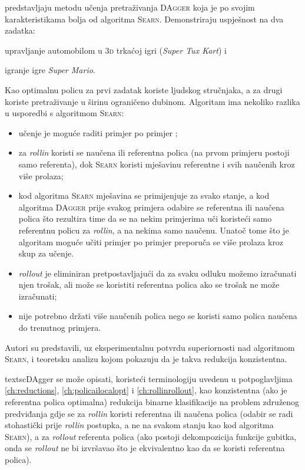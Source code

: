 \citet{ross2011reduction} predstavljaju metodu učenja pretraživanja
\textsc{DAgger}  koja je po svojim
karakteristikama bolja od algoritma \textsc{Searn}. Demonstriraju uspješnost na
dva zadatka:
\begin{inlinelist}
  \item upravljanje automobilom u \textsc{3d} trkaćoj igri (\textit{Super Tux
  Kart}) i
  \item igranje igre \textit{Super Mario}.
\end{inlinelist}
Kao optimalnu policu za prvi zadatak koriste ljudskog stručnjaka, a za drugi
koriste pretraživanje u širinu  ograničeno
dubinom. Algoritam ima nekoliko razlika u usporedbi s algoritmom \textsc{Searn}:
\begin{itemize}
  \item učenje je moguće raditi primjer po primjer ;
  \item za \textit{rollin} koristi se naučena ili referentna polica (na prvom
  primjeru postoji samo referenta), dok \textsc{Searn} koristi mješavinu
  referentne i svih naučenih kroz više prolaza;
  \item kod algoritma \textsc{Searn} mješavina se primijenjuje za svako stanje,
  a kod algoritma \textsc{DAgger} prije svakog primjera odabire se referentna
  ili naučena polica što rezultira time da se na nekim primjerima uči koristeći
  samo referentnu policu za \textit{rollin}, a na nekima samo naučenu. Unatoč
  tome što je algoritam moguće učiti primjer po primjer preporuča se više
  prolaza kroz skup za učenje.
  \item \textit{rollout} je eliminiran pretpostavljajući da za svaku odluku
  možemo izračunati njen trošak, ali može se koristiti referentna polica ako se
  trošak ne može izračunati;
  \item nije potrebno držati više naučenih polica nego se koristi samo polica
  naučena do trenutnog primjera.
\end{itemize}
Autori su predstavili, uz eksperimentalnu potvrdu superiornosti nad algoritmom
\textsc{Searn}, i teoretsku analizu kojom pokazuju da je takva redukcija
konzistentna.

textsc{DAgger} se može opisati, koristeći terminologiju uvedenu u potpoglavljima
\ref{ch:reductions}, \ref{ch:policailocalopt} i \ref{ch:rollinrollout}, kao
konzistentna (ako je referentna polica optimalna) redukcija binarne
klasifikacije na problem združenog predviđanja gdje se za \textit{rollin}
koristi referentna ili naučena polica (odabir se radi stohastički prije
\textit{rollin} postupka, a ne na svakom stanju kao kod algoritma
\textsc{Searn}), a za \textit{rollout} referenta polica (ako postoji
dekompozicija funkcije gubitka, onda se \textit{rollout} ne bi izvršavao što je
ekvivalentno kao da se koristi referentna polica).
